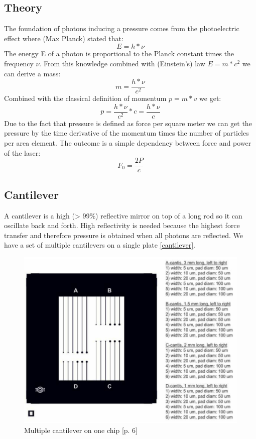 \documentclass[12pt,a4paper]{article}
\begin{document}
\begin{multicols}{2}
\section{Theory}
\label{theory}
The foundation of photons inducing a pressure comes from the photoelectric effect where (Max Planck) stated that:
$$E = h * \nu$$
The energy E of a photon is proportional to the Planck constant times the frequency $\nu$.
From this knowledge combined with (Einstein's) law $E = m * c^2$ we can derive a mass:
$$m = \frac{h * \nu}{c^2}$$
Combined with the classical definition of momentum $p = m * v$ we get:
$$p = \frac{h * \nu}{c^2} * c = \frac{h * \nu}{c}$$
Due to the fact that pressure is defined as force per square meter we can get the pressure by the time derivative of the momentum times the number of particles per area element. The outcome is a simple dependency between force and power of the laser:
$$F_0 = \frac{2P}{c}$$

\subsection{Cantilever}
A cantilever is a high (> 99\%) reflective mirror on top of a long rod so it can oscillate back and forth.
High reflectivity is needed because the highest force transfer and therefore pressure is obtained when all photons are reflected. We have a set of multiple cantilevers on a single plate \ref{cantilever}.
\begin{figure}[H]
	\centering
	\includegraphics[scale=1]{../figures/cantilever.png}
	\caption{Multiple cantilever on one chip \cite{physikwiki}[p. 6]}
	\label{fig:cantilever}
\end{figure}

\end{multicols}
\end{document}
